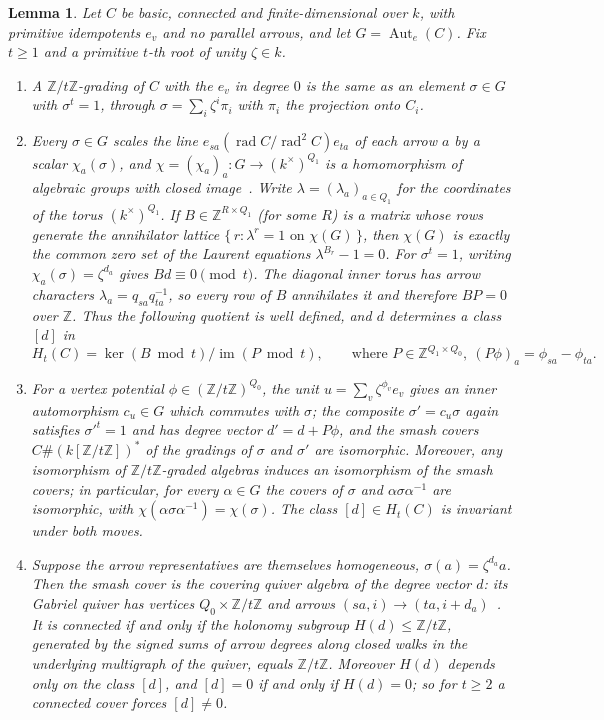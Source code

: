 \documentclass[11pt]{amsart}
\theoremstyle{plain}
\newtheorem{lemma}[theorem]{Lemma}
\theoremstyle{definition}
\DeclareMathOperator{\rad}{rad}
\DeclareMathOperator{\Aut}{Aut}
\newcommand{\ZZ}{\mathbb{Z}}
\begin{document}
\begin{lemma}\label{lem:census}
Let $C$ be basic, connected and finite-dimensional over $k$, with primitive idempotents $e_v$ and no parallel
arrows, and let $G=\Aut_e(C)$. Fix $t\ge 1$ and a primitive $t$-th root of unity $\zeta\in k$.
\begin{enumerate}
\item A $\ZZ/t\ZZ$-grading of $C$ with the $e_v$ in degree $0$ is the same as an element $\sigma\in G$ with
$\sigma^t=1$, through $\sigma=\sum_i\zeta^i\pi_i$ with $\pi_i$ the projection onto $C_i$.
\item Every $\sigma\in G$ scales the line $e_{sa}(\rad C/\rad^2 C)e_{ta}$ of each arrow $a$ by a scalar
$\chi_a(\sigma)$, and $\chi=(\chi_a)_a\colon G\to(k^\times)^{Q_1}$ is a homomorphism of algebraic groups with
closed image~\cite[Proposition~2.2.5]{Springer}. Write $\lambda=(\lambda_a)_{a\in Q_1}$ for the coordinates of
the torus $(k^\times)^{Q_1}$. If $B\in\ZZ^{R\times Q_1}$ (for some $R$) is a matrix whose rows generate the
annihilator lattice $\{\,r : \lambda^{r}=1 \text{ on } \chi(G)\,\}$, then $\chi(G)$ is exactly the common zero
set of the Laurent equations $\lambda^{B_r}-1=0$. For $\sigma^t=1$, writing $\chi_a(\sigma)=\zeta^{d_a}$ gives
$Bd\equiv 0\pmod t$. The diagonal inner torus has arrow characters $\lambda_a=q_{sa}q_{ta}^{-1}$, so every row
of $B$ annihilates it and therefore $BP=0$ over $\ZZ$. Thus the following quotient is well defined, and $d$
determines a class $[d]$ in
\[
  H_t(C)=\ker(B\bmod t)/\operatorname{im}(P\bmod t),
  \qquad\text{where } P\in\ZZ^{Q_1\times Q_0},\ (P\phi)_a=\phi_{sa}-\phi_{ta}.
\]
\item For a vertex potential $\phi\in(\ZZ/t\ZZ)^{Q_0}$, the unit $u=\sum_v\zeta^{\phi_v}e_v$ gives an inner
automorphism $c_u\in G$ which commutes with $\sigma$; the composite $\sigma'=c_u\sigma$ again satisfies
$\sigma'^t=1$ and has degree vector $d'=d+P\phi$, and the smash covers $C\#(k[\ZZ/t\ZZ])^{\ast}$ of the
gradings of $\sigma$ and $\sigma'$ are isomorphic. Moreover, any isomorphism of $\ZZ/t\ZZ$-graded algebras
induces an isomorphism of the smash covers; in particular, for every $\alpha\in G$ the covers of $\sigma$ and
$\alpha\sigma\alpha^{-1}$ are isomorphic, with $\chi(\alpha\sigma\alpha^{-1})=\chi(\sigma)$. The class $[d]\in
H_t(C)$ is invariant under both moves.
\item Suppose the arrow representatives are themselves homogeneous, $\sigma(a)=\zeta^{d_a}a$. Then the smash
cover is the covering quiver algebra of the degree vector $d$: its Gabriel quiver has vertices
$Q_0\times\ZZ/t\ZZ$ and arrows $(sa,i)\to(ta,i+d_a)$~\cite{CibilsMarcos,Green}. It is connected if and only if
the holonomy subgroup $H(d)\le\ZZ/t\ZZ$, generated by the signed sums of arrow degrees along closed walks in
the underlying multigraph of the quiver, equals $\ZZ/t\ZZ$. Moreover $H(d)$ depends only on the class $[d]$,
and $[d]=0$ if and only if $H(d)=0$; so for $t\ge 2$ a connected cover forces $[d]\neq 0$.
\end{enumerate}
\end{lemma}
\end{document}
